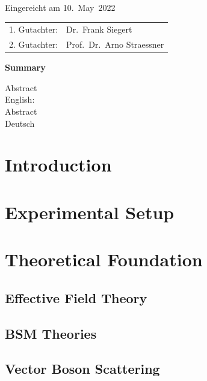 \thispagestyle{empty}\vspace*{48em}

Eingereicht am 10.~May~2022\vspace{1.5em}
\par{\large\begin{tabular}{ll}
        1. Gutachter: & Dr.~Frank Siegert         \\
        2. Gutachter: & Prof.~Dr.~Arno Straessner \\
    \end{tabular}}


\newpage
\begin{center}\large\bfseries Summary\end{center}


Abstract \\
English: \\

\vspace{20em}
Abstract \\
Deutsch \\


\tableofcontents

\chapter{Introduction}

\printnoidxglossary[type=acronym]
\printacronyms

\chapter{Experimental Setup}


\chapter{Theoretical Foundation}
\section{Effective Field Theory}


\section{BSM Theories}


\section{Vector Boson Scattering}


